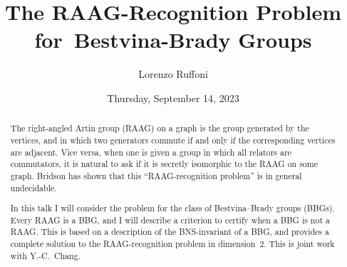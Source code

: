 \documentclass{UAmathtalk}
\author{Lorenzo Ruffoni}
\title{The RAAG-Recognition Problem for~Bestvina-Brady Groups}
\date{Thursday, September 14, 2023}
\begin{document}
\maketitle

\begin{abstract}
The right-angled Artin group (RAAG) on a graph is the group generated by the vertices, and in which two generators commute if and only if the corresponding vertices are adjacent. Vice versa, when one is given a group in which all relators are commutators, it is natural to ask if it is secretly isomorphic to the RAAG on some graph. Bridson has shown that this “RAAG-recognition problem” is in general undecidable.

In this talk I will consider the problem for the class of Bestvina--Brady groups (BBGs). Every RAAG is a BBG, and I will describe a criterion to certify when a BBG is not a RAAG. This is based on a description of the BNS-invariant of a BBG, and provides a complete solution to the RAAG-recognition problem in dimension~$2$. This is joint work with Y.-C.~Chang.

\end{abstract}
\end{document}
